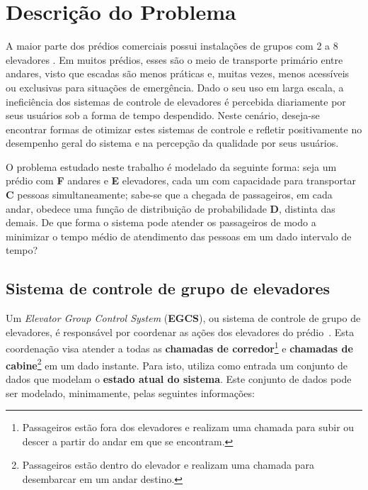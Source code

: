 \chapter{\label{chap:problem}Descrição do Problema}

A maior parte dos prédios comerciais possui instalações de grupos com 2 a 8
elevadores \cite{KOEHLEROTTIGER02}. Em muitos prédios, esses são o meio de
transporte primário entre andares, visto que escadas são menos práticas e,
muitas vezes, menos acessíveis ou exclusivas para situações de emergência. Dado
o seu uso em larga escala, a ineficiência dos sistemas de controle de elevadores
é percebida diariamente por seus usuários sob a forma de tempo despendido. Neste
cenário, deseja-se encontrar formas de otimizar estes sistemas de controle e
refletir positivamente no desempenho geral do sistema e na percepção da
qualidade por seus usuários.

O problema estudado neste trabalho é modelado da seguinte forma: seja um prédio
com \textbf{F} andares e \textbf{E} elevadores, cada um com capacidade para
transportar \textbf{C} pessoas simultaneamente; sabe-se que a chegada de
passageiros, em cada andar, obedece uma função de distribuição de probabilidade
\textbf{D}, distinta das demais. De que forma o sistema pode atender os
passageiros de modo a minimizar o tempo médio de atendimento das pessoas em um
dado intervalo de tempo?

\section{\label{section:egcs}Sistema de controle de grupo de elevadores}

Um \textit{Elevator Group Control System} (\textbf{EGCS}), ou sistema de
controle de grupo de elevadores, é responsável por coordenar as ações dos
elevadores do prédio~\cite{kuzunuki1984elevator}. Esta coordenação visa atender
a todas as \textbf{chamadas de corredor}\footnote{Passageiros estão fora dos
elevadores e realizam uma chamada para subir ou descer a partir do andar em que
se encontram.} e \textbf{chamadas de cabine}\footnote{Passageiros estão dentro
do elevador e realizam uma chamada para desembarcar em um andar destino.} em um
dado instante. Para isto, utiliza como entrada um conjunto de dados que modelam
o \textbf{estado atual do sistema}. Este conjunto de dados pode ser modelado,
minimamente, pelas seguintes informações:

